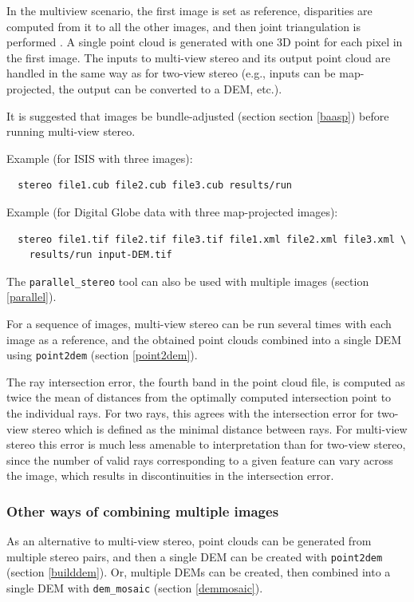 In the multiview scenario, the first image is set as reference, disparities are
computed from it to all the other images, and then joint triangulation
is performed \cite{slabaugh2001optimal}. A single
point cloud is generated with one 3D point for each pixel in the first
image. The inputs to multi-view stereo and its output point cloud are
handled in the same way as for two-view stereo (e.g., inputs can be
map-projected, the output can be converted to a DEM, etc.).

It is suggested that images be bundle-adjusted (section section
\ref{baasp}) before running multi-view stereo.

Example (for ISIS with three images):
\begin{verbatim}
  stereo file1.cub file2.cub file3.cub results/run
\end{verbatim}

Example (for Digital Globe data with three map-projected images):
\begin{verbatim}
  stereo file1.tif file2.tif file3.tif file1.xml file2.xml file3.xml \
    results/run input-DEM.tif
\end{verbatim}

The \texttt{parallel\_stereo} tool can also be used with multiple images
(section \ref{parallel}).

For a sequence of images, multi-view stereo can be run several times
with each image as a reference, and the obtained point clouds combined
into a single DEM using \texttt{point2dem} (section \ref{point2dem}).

The ray intersection error, the fourth band in the point cloud
file, is computed as twice the mean of distances from the optimally
computed intersection point to the individual rays. For two rays, this
agrees with the intersection error for two-view stereo which is defined
as the minimal distance between rays. For multi-view stereo this error
is much less amenable to interpretation than for two-view stereo, since the
number of valid rays corresponding to a given feature can vary across
the image, which results in discontinuities in the intersection error.

\subsubsection*{Other ways of combining multiple images}

As an alternative to multi-view stereo, point clouds can be generated
from multiple stereo pairs, and then a single DEM can be created with
\texttt{point2dem} (section \ref{builddem}). Or, multiple DEMs
can be created, then combined into a single DEM with \texttt{dem\_mosaic}
(section \ref{demmosaic}).

